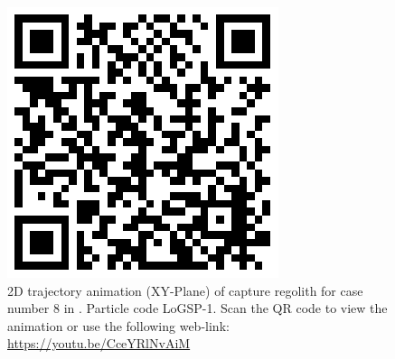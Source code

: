 \begin{figure}[htb]
\centering
\captionsetup{justification=centering}
\includegraphics[scale=0.25]{longest_edge_perturbations/3.2Density_1cmSize/qrcode_8ms_165Azimuth_45SolarPhase.png}
\caption{2D trajectory animation (XY-Plane) of capture regolith for case number 8 in . Particle code LoGSP-1. Scan the QR code to view the animation or use the following web-link: \url{https://youtu.be/CceYRlNvAiM}}
\label{fig:LoGSP_1_capture_case_8_2d_trajectory_animation}
\end{figure}
\FloatBarrier

